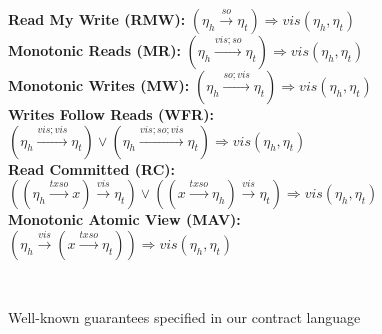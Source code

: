 \begin{figure}[h]
	\centering
	\begin{minipage}{.88\textwidth}
		{\bf Read My Write (RMW): } \hspace {12 mm}
		$ (\eta_h \xrightarrow{so} \eta_t) \Rightarrow vis (\eta_h,\eta_t) $ \\
		
		{\bf Monotonic Reads (MR): } \hspace {12 mm}
		$ (\eta_h \xrightarrow{vis;so} \eta_t) \Rightarrow vis (\eta_h,\eta_t) $ \\
		
		{\bf Monotonic Writes (MW): } 	\hspace {10 mm}
		$ (\eta_h \xrightarrow{so;vis} \eta_t) \Rightarrow vis (\eta_h,\eta_t) $ \\
		
		{\bf Writes Follow Reads (WFR): } \hspace {5 mm} 	
		$ (\eta_h \xrightarrow{vis;vis} \eta_t) \vee  (\eta_h \xrightarrow{vis;so;vis} \eta_t)  \Rightarrow vis (\eta_h,\eta_t)  $ \\
		
		{\bf Read Committed (RC): } \hspace {14 mm} 		
		$  ((\eta_h \xrightarrow{txso} x)\xrightarrow{vis} \eta_t) \vee 
		((x \xrightarrow{txso} \eta_h)\xrightarrow{vis} \eta_t)  \Rightarrow vis (\eta_h,\eta_t) $ \\
		
		{\bf Monotonic Atomic View (MAV): } 	
		$ (\eta_h \xrightarrow{vis} (x \xrightarrow{txso}  \eta_t))  \Rightarrow vis (\eta_h,\eta_t) $ \\

	\end{minipage}
	\\
	\hrulefill
	\caption{Well-known guarantees specified in our contract language}
	\label{fig:ctrt-examples}
\end{figure}
